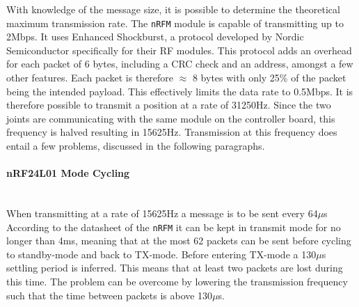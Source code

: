 With knowledge of the message size, it is possible to determine the theoretical maximum transmission rate.
The \texttt{nRFM} module is capable of transmitting up to 2Mbps.
It uses Enhanced Shockburst, a protocol developed by Nordic Semiconductor specifically for their RF modules.
This protocol adds an overhead for each packet of 6 bytes, including a CRC check and an address, amongst a few other features.
Each packet is therefore $\approx$ 8 bytes with only 25\% of the packet being the intended payload.
This effectively limits the data rate to 0.5Mbps.
It is therefore possible to transmit a position at a rate of 31250Hz.
Since the two joints are communicating with the same module on the controller board, this frequency is halved resulting in 15625Hz.
Transmission at this frequency does entail a few problems, discussed in the following paragraphs.
\paragraph{nRF24L01 Mode Cycling}~\\ %
\label{par:nrf24l01_mode_cycling}
When transmitting at a rate of 15625Hz a message is to be sent every 64$\mu$s
According to the datasheet of the \texttt{nRFM} it can be kept in transmit mode for no longer than 4ms, meaning that at the most 62 packets can be sent before cycling to standby-mode and back to TX-mode.
Before entering TX-mode a 130$\mu$s settling period is inferred.
This means that at least two packets are lost during this time.
The problem can be overcome by lowering the transmission frequency such that the time between packets is above 130$\mu$s.


